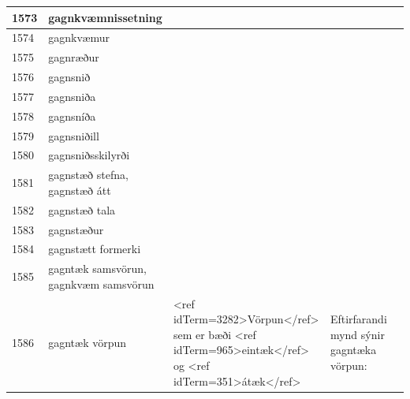 \begin{longtable}{p{}|p{}|p{}|p{}|p{}}
\hline
1573 & gagnkvæmnissetning &  &  &  \\
\hline
1574 & gagnkvæmur &  &  &  \\
\hline
1575 & gagnræður &  &  &  \\
\hline
1576 & gagnsnið &  &  &  \\
\hline
1577 & gagnsniða &  &  &  \\
\hline
1578 & gagnsníða &  &  &  \\
\hline
1579 & gagnsniðill &  &  &  \\
\hline
1580 & gagnsniðsskilyrði &  &  &  \\
\hline
1581 & gagnstæð stefna, gagnstæð átt &  &  &  \\
\hline
1582 & gagnstæð tala &  &  &  \\
\hline
1583 & gagnstæður &  &  &  \\
\hline
1584 & gagnstætt formerki &  &  &  \\
\hline
1585 & gagntæk samsvörun, gagnkvæm samsvörun &  &  &  \\
\hline
1586 & gagntæk vörpun & <ref idTerm=3282>Vörpun</ref> sem er bæði <ref idTerm=965>eintæk</ref> og <ref idTerm=351>átæk</ref> & Eftirfarandi mynd sýnir gagntæka vörpun:


\end{longtable}
